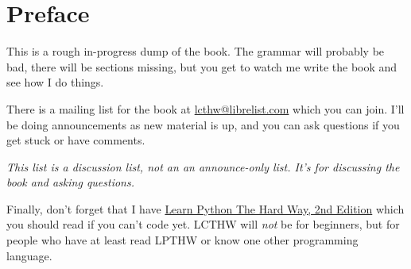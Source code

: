 \chapter{Preface}

This is a rough in-progress dump of the book.  The grammar will probably be bad, there
will be sections missing, but you get to watch me write the book and see how I do things.

There is a mailing list for the book at
\href{mailto:lcthw@librelist.com}{lcthw@librelist.com} which you can join.
I'll be doing announcements as new material is up, and you can ask questions if
you get stuck or have comments. 

\emph{This list is a discussion list, not an an announce-only list.  It's for discussing the book and asking questions.}

Finally, don't forget that I have \href{http://learnpythonthehardway.org}{Learn
Python The Hard Way, 2nd Edition} which you should read if you can't code yet.
LCTHW will \emph{not} be for beginners, but for people who have at least read
LPTHW or know one other programming language.

